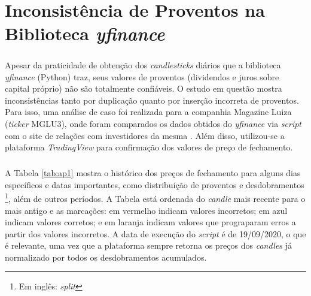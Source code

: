 \chapter{Inconsistência de Proventos na Biblioteca \textit{yfinance}}
\label{ApendiceA}

\paragraph{} Apesar da praticidade de obtenção dos \textit{candlesticks} diários que a biblioteca \textit{yfinance} (Python) traz, seus valores de proventos (dividendos e juros sobre capital próprio) não são totalmente confiáveis. O estudo em questão mostra inconsistências tanto por duplicação quanto por inserção incorreta de proventos. Para isso, uma análise de caso foi realizada para a companhia Magazine Luiza (\textit{ticker} MGLU3), onde foram comparados os dados obtidos do \textit{yfinance} via \textit{script} com o site de relações com investidores da mesma \cite{mglu_ri}. Além disso, utilizou-se a plataforma \textit{TradingView} \cite{tradingview} para confirmação dos valores de preço de fechamento.


\paragraph{} A Tabela \ref{tab:ap1} mostra o histórico dos preços de fechamento para alguns dias específicos e datas importantes, como distribuição de proventos e desdobramentos \footnote{Em inglês: \textit{split}}, além de outros períodos. A Tabela está ordenada do \textit{candle} mais recente para o mais antigo e as marcações: em vermelho indicam valores incorretos; em azul indicam valores corretos; e em laranja indicam valores que prograparam erros a partir dos valores incorretos. A data de execução do \textit{script} é de 19/09/2020, o que é relevante, uma vez que a plataforma sempre retorna os preços dos \textit{candles} já normalizado por todos os desdobramentos acumulados.


